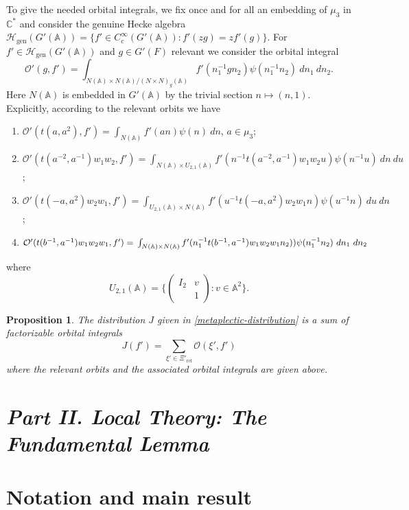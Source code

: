 \documentclass[12pt]{amsart}
\newcommand{\gen}{\operatorname{gen}}
\newcommand{\A}{\mathbb{A}}
\newcommand{\C}{\mathbb{C}}
\renewcommand{\H}{\mathcal{H}}
\renewcommand{\O}{\mathcal{O}}
\newcommand{\rel}{{\operatorname{rel}}}
\newtheorem{proposition}[theorem]{Proposition}%
\theoremstyle{remark}
\begin{document}
To give the needed orbital integrals, 
we fix once and for all an embedding of $\mu_3$ in $\C^*$ and consider the genuine Hecke algebra $\H_{\gen}(G'(\A))=\{f'\in C_c^\infty(G'(\A)): f'(zg)=zf'(g)\}$. 
For $f'\in \H_{\gen}(G'(\A))$ and $g\in G'(F)$ relevant we consider the orbital integral
\[
\O'(g,f')=\int_{N(\A)\times N(\A)/(N\times N)_g(\A)} f'(n_1^{-1}gn_2)\psi(n_1^{-1}n_2)\ dn_1\ dn_2.
\]
Here $N(\A)$ is embedded in $G'(\A)$ by the trivial section $n\mapsto (n,1)$.
Explicitly, according to the relevant orbits we have
\begin{enumerate}
\item $\O'(t(a,a^2),f')=\int_{N(\A)} f'(an)\psi(n)\ dn$, $a\in \mu_3$;
\item $\O'(t(a^{-2},a^{-1})w_1w_2,f')=\int_{N(\A)\times U_{2,1}(\A)} f'(n^{-1}t(a^{-2},a^{-1})w_1w_2u)\psi(n^{-1}u)\ dn\ du$;
\item $\O'(t(-a,a^2)w_2w_1,f')=\int_{U_{2,1}(\A)\times N(\A)} f'(u^{-1}t(-a,a^2)w_2w_1n)\psi(u^{-1}n)\ du\ dn$;
\item $\O'(t(b^{-1},a^{-1})w_1w_2w_1,f')=\\ \int_{N(\A)\times N(\A)} f'(n_1^{-1}t(b^{-1},a^{-1})w_1w_2w_1n_2))\psi(n_1^{-1}n_2)\ dn_1\ dn_2$
\end{enumerate}
where 
\[
U_{2,1}(\A)=\{\begin{pmatrix} I_2 & v \\  & 1 \end{pmatrix} : v\in \A^2\}.
\]

\begin{proposition}\label{eq unfold2} The distribution $J$ given in \eqref{metaplectic-distribution} is a sum of factorizable orbital integrals
\begin{equation*}
J(f')=\sum_{\xi'\in {\Xi}'_\rel} \O(\xi',f')
\end{equation*}
where the relevant orbits and the associated orbital integrals are given above.
\end{proposition}

\goodbreak

\section*{\it{Part II. Local Theory: The Fundamental Lemma}}\label{Local theory}

\section{Notation and main result}
\end{document}
